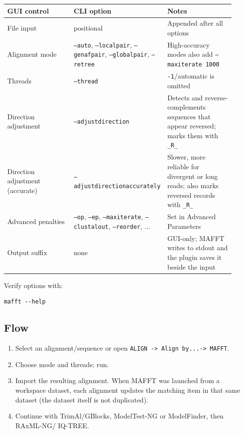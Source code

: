 \documentclass[11pt]{report}
\begin{document}
{\footnotesize
\begin{longtable}{@{}>{\raggedright\arraybackslash}p{0.31\linewidth}>{\raggedright\arraybackslash}p{0.31\linewidth}>{\raggedright\arraybackslash}p{0.31\linewidth}@{}}
\toprule
GUI control & CLI option & Notes \\
\midrule
\endhead
File input & positional & Appended after all options \\
Alignment mode & \texttt{--auto}, \texttt{--localpair}, \texttt{--genafpair}, \texttt{--globalpair}, \texttt{--retree} & High-accuracy modes also add \texttt{--maxiterate 1000} \\
Threads & \texttt{--thread} & \texttt{-1}/automatic is omitted \\
Direction adjustment & \texttt{--adjustdirection} & Detects and reverse-complements sequences that appear reversed; marks them with \texttt{\_\allowbreak R\_\allowbreak } \\
Direction adjustment (accurate) & \texttt{--adjustdirectionaccurately} & Slower, more reliable for divergent or long reads; also marks reversed records with \texttt{\_\allowbreak R\_\allowbreak } \\
Advanced penalties & \texttt{--op}, \texttt{--ep}, \texttt{--maxiterate}, \texttt{--clustalout}, \texttt{--reorder}, ... & Set in Advanced Parameters \\
Output suffix & none & GUI-only; MAFFT writes to stdout and the plugin saves it beside the input \\
\bottomrule
\end{longtable}
}

Verify options with:

\begin{lstlisting}
mafft --help
\end{lstlisting}

\subsection{Flow}

\begin{enumerate}
  \item Select an alignment/sequence or open \texttt{ALIGN -> Align by.\allowbreak .\allowbreak .\allowbreak  -> MAFFT}.
  \item Choose mode and threads; run.
  \item Import the resulting alignment. When MAFFT was launched from a workspace dataset, each alignment updates the matching item in that same dataset (the dataset itself is not duplicated).
  \item Continue with TrimAl/GBlocks, ModelTest-NG or ModelFinder, then RAxML-NG/ IQ-TREE.
\end{enumerate}
\end{document}
